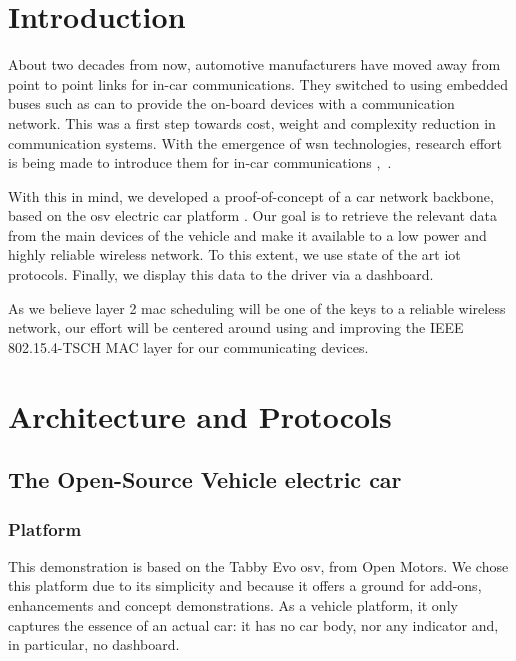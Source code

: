 \documentclass[runningheads]{llncs}
\begin{document}
\section{Introduction}
\label{sec:intro}

About two decades from now, automotive manufacturers have moved away from point to point links for in-car communications.
They switched to using embedded buses such as \gls{can} to provide the on-board devices with a communication network.
This was a first step towards cost, weight and complexity reduction in communication systems.
With the emergence of \gls{wsn} technologies, research effort is being made to introduce them for in-car communications \cite{Bi2015},~\cite{Huang2018}.


With this in mind, we developed a proof-of-concept of a car network backbone, based on the \gls{osv} electric car platform \cite{open-motors-tabby}.
Our goal is to retrieve the relevant data from the main devices of the vehicle and make it available to a low power and highly reliable wireless network.
To this extent, we use state of the art \gls{iot} protocols.
Finally, we display this data to the driver via a dashboard.


As we believe layer 2 \gls{mac} scheduling will be one of the keys to a reliable wireless network, our effort will be centered around using and improving the IEEE 802.15.4-TSCH MAC layer for our communicating devices.

\section{Architecture and Protocols}

\subsection{The Open-Source Vehicle electric car}
\label{subsec:osv}

\subsubsection{Platform}

This demonstration is based on the Tabby Evo \gls{osv}, from Open Motors.
We chose this platform due to its simplicity and because it offers a ground for add-ons, enhancements and concept demonstrations.
As a vehicle platform, it only captures the essence of an actual car: it has
no car body, nor any indicator and, in particular, no dashboard.
\end{document}
